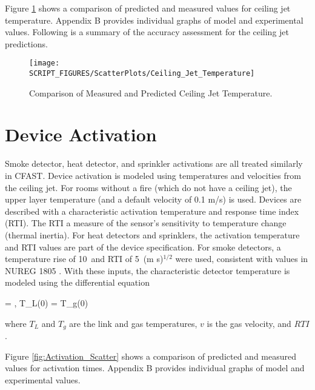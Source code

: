 Figure \ref{fig:Ceiling_Jet_Scatter} shows a comparison of predicted and measured values for ceiling jet temperature. Appendix B provides individual graphs of model and experimental values. Following is a summary of the accuracy assessment for the ceiling jet predictions.
\label{Ceiling Jet Temperature}

\begin{figure}
\begin{center}
\texttt{[image: SCRIPT\_FIGURES/ScatterPlots/Ceiling\_Jet\_Temperature]}
\end{center}
\caption{Comparison of Measured and Predicted Ceiling Jet Temperature.} \label{fig:Ceiling_Jet_Scatter}
\end{figure}

\section{Device Activation}

Smoke detector, heat detector, and sprinkler activations are all treated similarly in CFAST.  Device activation is modeled using temperatures and velocities from the ceiling jet.  For rooms without a fire (which do not have a ceiling jet), the upper layer temperature (and a default velocity of 0.1 m/s) is used.  Devices are described with a characteristic activation temperature and response time index (RTI). The RTI a measure of the sensor's sensitivity to temperature change (thermal inertia). For heat detectors and sprinklers, the activation temperature and RTI values are part of the device specification. For smoke detectors, a temperature rise of 10~\degc and RTI of 5~(m s)$^{1/2}$ were used, consistent with values in NUREG 1805 \cite{NRCNUREG1805}. With these inputs, the characteristic detector temperature is modeled using the differential equation \cite{Heskestad:1976}

\be {} =   \; , \; T_L(0) = T_g(0)  \ee

where $T_L$ and $T_g$ are the link and gas temperatures, $v$ is the gas velocity, and $RTI$.

Figure \ref{fig:Activation_Scatter} shows a comparison of predicted and measured values for activation times. Appendix B provides individual graphs of model and experimental values.
\label{Smoke Alarm Activation Time (Temperature Surrogate)}
\label{Smoke Alarm Activation Time (Smoke Obscuration)}
\label{Sprinkler Activation Time}

